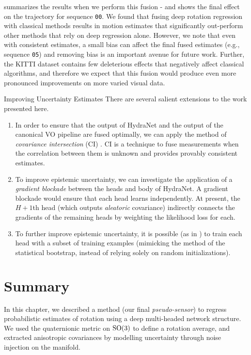  summarizes the results when we perform this fusion - and  shows the final effect on the trajectory for sequence \texttt{00}. We found that fusing deep rotation regression with classical methods results in motion estimates that significantly out-perform other methods that rely on deep regression alone. However, we note that even with consistent estimates, a small bias can affect the final fused estimates (e.g., sequence \texttt{05}) and removing bias is an important avenue for future work. Further, the KITTI dataset contains few deleterious effects that negatively affect classical algorithms, and therefore we expect that this fusion would produce even more pronounced improvements on more varied visual data.

\begin{remark}{Improving Uncertainty Estimates}
	There are several salient extensions to the work presented here. 
	\begin{enumerate}
	\item 	In order to ensure that the output of HydraNet and the output of the canonical VO pipeline are fused optimally, we can apply the method of \textit{covariance intersection} (CI) \citep{julier2007using}. CI is a technique to fuse measurements when the correlation between them is unknown and provides provably consistent estimates.
	\item To improve epistemic uncertainty, we can investigate the application of a \textit{gradient blockade} between the heads and body of HydraNet. A gradient blockade would ensure that each head learns independently. At present, the $H+1$th head (which outputs \textit{aleatoric} covariance) indirectly connects the gradients of the remaining heads by weighting the likelihood loss \citep{brachmann2019ngransac} for each.
	\item To further improve epistemic uncertainty, it is possible (as in \cite{Osband2016}) to train each head with a subset of training examples (mimicking the method of the statistical bootstrap, instead of relying solely on random initializations).
	\end{enumerate}
 \end{remark}



\section{Summary}
In this chapter, we described a method (our final \textit{pseudo-sensor}) to regress probabilistic estimates of rotation using a deep multi-headed network structure. We used the quaternionic metric on $\mathrm{SO}(3)$ to define a rotation average, and extracted anisotropic covariances by modelling uncertainty through noise injection on the manifold. 

